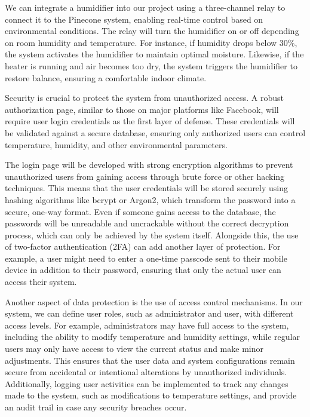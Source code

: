 \documentclass[a4paper]{scrartcl}
\begin{document}
We can integrate a humidifier into our project using a three-channel relay to connect it to the Pinecone system, enabling real-time control based on environmental conditions. The relay will turn the humidifier on or off depending on room humidity and temperature. For instance, if humidity drops below 30\%, the system activates the humidifier to maintain optimal moisture. Likewise, if the heater is running and air becomes too dry, the system triggers the humidifier to restore balance, ensuring a comfortable indoor climate.

Security is crucial to protect the system from unauthorized access. A robust authorization page, similar to those on major platforms like Facebook, will require user login credentials as the first layer of defense. These credentials will be validated against a secure database, ensuring only authorized users can control temperature, humidity, and other environmental parameters.

The login page will be developed with strong encryption algorithms to prevent unauthorized users from gaining access through brute force or other hacking techniques. This means that the user credentials will be stored securely using hashing algorithms like bcrypt or Argon2, which transform the password into a secure, one-way format. Even if someone gains access to the database, the passwords will be unreadable and uncrackable without the correct decryption process, which can only be achieved by the system itself. Alongside this, the use of two-factor authentication (2FA) can add another layer of protection. For example, a user might need to enter a one-time passcode sent to their mobile device in addition to their password, ensuring that only the actual user can access their system.

Another aspect of data protection is the use of access control mechanisms. In our system, we can define user roles, such as administrator and user, with different access levels. For example, administrators may have full access to the system, including the ability to modify temperature and humidity settings, while regular users may only have access to view the current status and make minor adjustments. This ensures that the user data and system configurations remain secure from accidental or intentional alterations by unauthorized individuals. Additionally, logging user activities can be implemented to track any changes made to the system, such as modifications to temperature settings, and provide an audit trail in case any security breaches occur.
\end{document}
